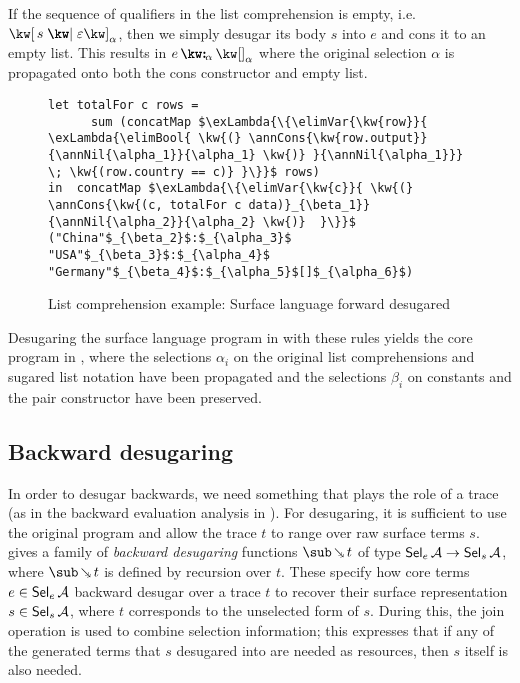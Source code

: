 If the sequence of qualifiers in the list comprehension is empty, i.e. $\annListComp{s}{\seqEmpty}{\alpha}$, then we simply desugar its body $s$ into $e$ and cons it to an empty list. This results in $\annCons{e}{\annNil{\alpha}}{\alpha}$ where the original selection $\alpha$ is propagated onto both the cons constructor and empty list.

\begin{figure}[H]
\small
\begin{lstlisting}
let totalFor c rows =
      sum (concatMap $\exLambda{\{\elimVar{\kw{row}}{  \exLambda{\elimBool{ \kw{(} \annCons{\kw{row.output}}{\annNil{\alpha_1}}{\alpha_1} \kw{)} }{\annNil{\alpha_1}}} \; \kw{(row.country == c)} }\}}$ rows)
in  concatMap $\exLambda{\{\elimVar{\kw{c}}{ \kw{(} \annCons{\kw{(c, totalFor c data)}_{\beta_1}}{\annNil{\alpha_2}}{\alpha_2} \kw{)}  }\}}$ ("China"$_{\beta_2}$:$_{\alpha_3}$ "USA"$_{\beta_3}$:$_{\alpha_4}$ "Germany"$_{\beta_4}$:$_{\alpha_5}$[]$_{\alpha_6}$)
\end{lstlisting}
\caption{List comprehension example: Surface language forward desugared}
\label{fig:surface-language:example-4}
\end{figure}

\noindent
Desugaring the surface language program in  with these rules yields the core program in , where the selections $\alpha_i$ on the original list comprehensions and sugared list notation have been propagated and the selections $\beta_i$ on constants and the pair constructor have been preserved.

\subsection{Backward desugaring}

In order to desugar backwards, we need something that plays the role of a trace (as in the backward evaluation analysis in ). For desugaring, it is sufficient to use the original program and allow the trace $t$ to range over raw surface terms $s$.  gives a family of \textit{backward desugaring} functions $\desugarBwdR{t}$ of type $\textup{\textsf{Sel}}_{e}\,{\mathcal{A}} \to \textup{\textsf{Sel}}_{s}\,{\mathcal{A}}$, where $\desugarBwdR{t}$ is defined by recursion over $t$. These specify how core terms $e \in \textup{\textsf{Sel}}_{e}\,{\mathcal{A}}$ backward desugar over a trace $t$ to recover their surface representation $s \in \textup{\textsf{Sel}}_{s}\,{\mathcal{A}}$, where $t$ corresponds to the unselected form of $s$. During this, the join operation is used to combine selection information; this expresses that if any of the generated terms that $s$ desugared into are needed as resources, then $s$ itself is also needed.


